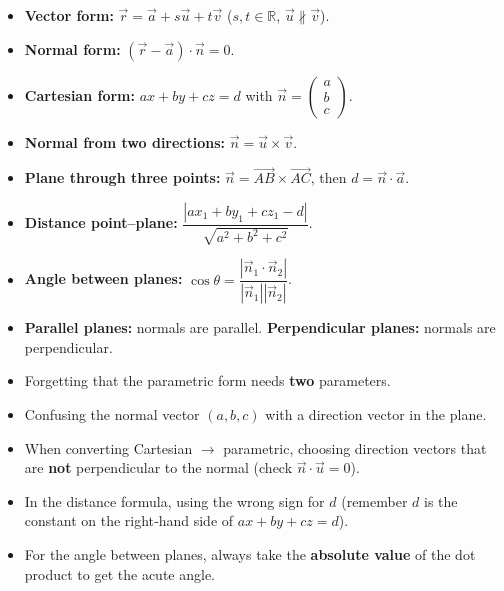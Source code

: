 \documentclass[11pt]{article}
\begin{document}
\begin{aretenir}
\begin{itemize}
\item \textbf{Vector form:} $\vec{r}=\vec{a}+s\vec{u}+t\vec{v}$ ($s,t\in\mathbb{R}$, $\vec{u}\nparallel\vec{v}$).
\item \textbf{Normal form:} $(\vec{r}-\vec{a})\cdot\vec{n}=0$.
\item \textbf{Cartesian form:} $ax+by+cz=d$ with $\vec{n}=\begin{pmatrix}a\\b\\c\end{pmatrix}$.
\item \textbf{Normal from two directions:} $\vec{n}=\vec{u}\times\vec{v}$.
\item \textbf{Plane through three points:} $\vec{n}=\vec{AB}\times\vec{AC}$, then $d=\vec{n}\cdot\vec{a}$.
\item \textbf{Distance point–plane:} $\dfrac{|ax_1+by_1+cz_1-d|}{\sqrt{a^2+b^2+c^2}}$.
\item \textbf{Angle between planes:} $\cos\theta=\dfrac{|\vec{n}_1\cdot\vec{n}_2|}{|\vec{n}_1||\vec{n}_2|}$.
\item \textbf{Parallel planes:} normals are parallel. \textbf{Perpendicular planes:} normals are perpendicular.
\end{itemize}
\end{aretenir}

\begin{attention}
\begin{itemize}
\item Forgetting that the parametric form needs \textbf{two} parameters.
\item Confusing the normal vector $(a,b,c)$ with a direction vector in the plane.
\item When converting Cartesian $\to$ parametric, choosing direction vectors that are \textbf{not} perpendicular to the normal (check $\vec{n}\cdot\vec{u}=0$).
\item In the distance formula, using the wrong sign for $d$ (remember $d$ is the constant on the right‑hand side of $ax+by+cz=d$).
\item For the angle between planes, always take the \textbf{absolute value} of the dot product to get the acute angle.
\end{itemize}
\end{attention}
\end{document}
